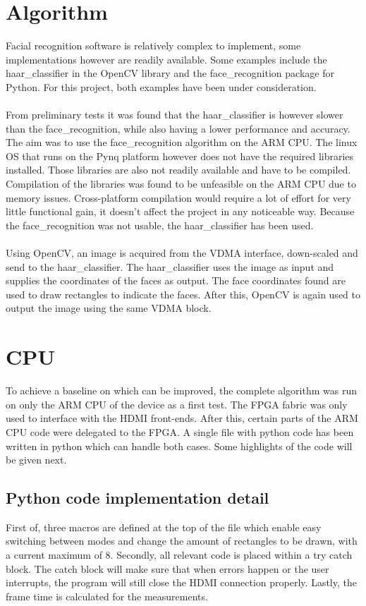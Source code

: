 \documentclass[conference]{IEEEtran}
\begin{document}
\section{Algorithm}
Facial recognition software is relatively complex to implement, some implementations however are readily available. Some examples include the haar\_classifier in the OpenCV library and the face\_recognition package for Python. For this project, both examples have been under consideration.\\
\\
From preliminary tests it was found that the haar\_classifier is however slower than the face\_recognition, while also having a lower performance and accuracy. The aim was to use the face\_recognition algorithm on the ARM CPU. The linux OS that runs on the Pynq platform however does not have the required libraries installed. Those libraries are also not readily available and have to be compiled. Compilation of the libraries was found to be unfeasible on the ARM CPU due to memory issues. Cross-platform compilation would require a lot of effort for very little functional gain, it doesn't affect the project in any noticeable way. Because the face\_recognition was not usable, the haar\_classifier has been used.\\
\\
Using OpenCV, an image is acquired from the VDMA interface, down-scaled and send to the haar\_classifier. The haar\_classifier uses the image as input and supplies the coordinates of the faces as output. The face coordinates found are used to draw rectangles to indicate the faces. After this, OpenCV is again used to output the image using the same VDMA block.\\

\section{CPU}
To achieve a baseline on which can be improved, the complete algorithm was run on only the ARM CPU of the device as a first test. The FPGA fabric was only used to interface with the HDMI front-ends. After this, certain parts of the ARM CPU code were delegated to the FPGA. A single file with python code has been written in python which can handle both cases. Some highlights of the code will be given next.
\subsection{Python code implementation detail}
First of, three macros are defined at the top of the file which enable easy switching between modes and change the amount of rectangles to be drawn, with a current maximum of 8. Secondly, all relevant code is placed within a try catch block. The catch block will make sure that when errors happen or the user interrupts, the program will still close the HDMI connection properly. Lastly, the frame time is calculated for the \si{\fps} measurements.
\end{document}
